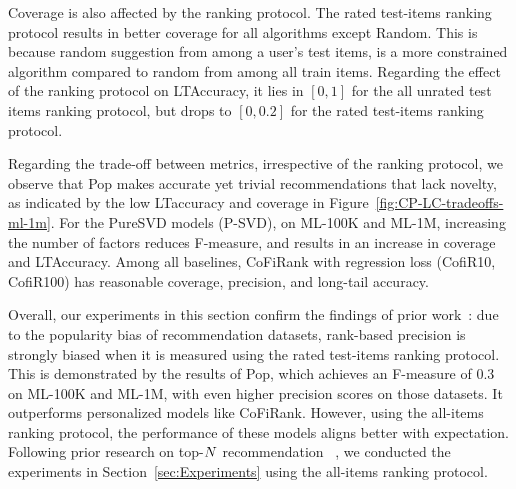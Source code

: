Coverage is also affected by the ranking protocol. The rated test-items ranking protocol  results in better coverage for all algorithms except Random.  This is because random suggestion from among a user's test items, is a more constrained algorithm compared to random from among all train items. 
Regarding the effect of the ranking protocol on  LTAccuracy,  it lies in $[0,1]$ for the all unrated test items ranking protocol,  but drops to $[0,0.2]$ for the rated test-items ranking protocol.  %

 
Regarding the  trade-off between  metrics, irrespective of the ranking protocol, we observe that  Pop makes accurate yet trivial recommendations that lack novelty,   as indicated by the low LTaccuracy and coverage in Figure~\ref{fig:CP-LC-tradeoffs-ml-1m}. For the PureSVD models (P-SVD), on ML-100K and ML-1M, increasing the number of factors reduces  F-measure, and results in an increase in coverage and LTAccuracy.  Among all baselines, CoFiRank with regression loss (CofiR10, CofiR100) has reasonable coverage, precision, and long-tail accuracy. 

Overall, our experiments in this section confirm the findings of prior work~\cite{cremonesi2010performance,steck2013evaluation,agarwal_chen_2016}:  due to the popularity bias of recommendation datasets, rank-based precision  is strongly biased when it is measured using the rated test-items ranking  protocol.  This is demonstrated by the results of Pop, which  achieves an F-measure of $0.3$  on ML-100K  and  ML-1M, with even higher precision scores on those datasets.    It outperforms personalized models like CoFiRank.  However, using the all-items ranking protocol, the performance of these models aligns better with expectation.   Following prior research on top-$N$ recommendation ~\cite{steck2013evaluation,vargas2014improving}, we conducted  the experiments in Section~\ref{sec:Experiments}  using the all-items ranking protocol.
 





